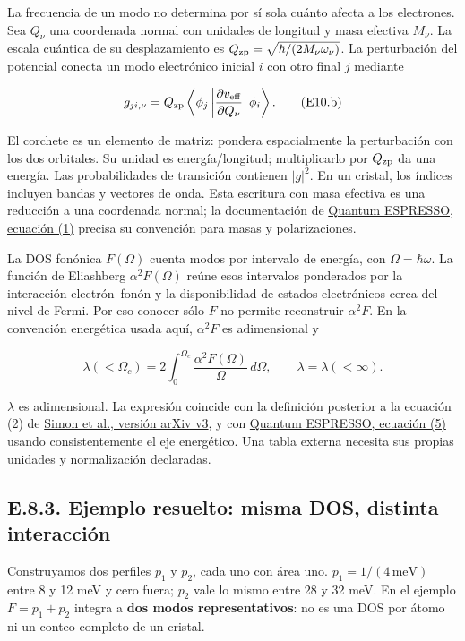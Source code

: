 \documentclass[
  spanish,
  10pt,
  a4paper,
]{article}
\begin{document}
La frecuencia de un modo no determina por sí sola cuánto afecta a los
electrones. Sea \(Q_\nu\) una coordenada normal con unidades de longitud
y masa efectiva \(M_\nu\). La escala cuántica de su desplazamiento es
\(Q_{\rm zp}=\sqrt{\hbar/(2M_\nu\omega_\nu)}\). La perturbación del
potencial conecta un modo electrónico inicial \(i\) con otro final \(j\)
mediante

\[
g_{ji,\nu}=Q_{\rm zp}
\left\langle\phi_j\left|\frac{\partial v_{\rm eff}}{\partial Q_\nu}\right|\phi_i\right\rangle.
\tag{E10.b}
\]

El corchete es un elemento de matriz: pondera espacialmente la
perturbación con los dos orbitales. Su unidad es energía/longitud;
multiplicarlo por \(Q_{\rm zp}\) da una energía. Las probabilidades de
transición contienen \(|g|^2\). En un cristal, los índices incluyen
bandas y vectores de onda. Esta escritura con masa efectiva es una
reducción a una coordenada normal; la documentación de
\href{https://www.quantum-espresso.org/Doc/ph_user_guide/node19.html}{Quantum
ESPRESSO, ecuación (1)} precisa su convención para masas y
polarizaciones.

La DOS fonónica \(F(\Omega)\) cuenta modos por intervalo de energía, con
\(\Omega=\hbar\omega\). La función de Eliashberg \(\alpha^2F(\Omega)\)
reúne esos intervalos ponderados por la interacción electrón--fonón y la
disponibilidad de estados electrónicos cerca del nivel de Fermi. Por eso
conocer sólo \(F\) no permite reconstruir \(\alpha^2F\). En la
convención energética usada aquí, \(\alpha^2F\) es adimensional y

\[
\lambda(<\Omega_c)=2\int_0^{\Omega_c}
\frac{\alpha^2F(\Omega)}{\Omega}\,d\Omega,
\qquad \lambda=\lambda(<\infty).
\tag{E10.c}
\]

\(\lambda\) es adimensional. La expresión coincide con la definición
posterior a la ecuación (2) de
\href{https://arxiv.org/html/2501.13791v3}{Simon et al., versión arXiv
v3}, y con
\href{https://www.quantum-espresso.org/Doc/ph_user_guide/node19.html}{Quantum
ESPRESSO, ecuación (5)} usando consistentemente el eje energético. Una
tabla externa necesita sus propias unidades y normalización declaradas.

\subsection{E.8.3. Ejemplo resuelto: misma DOS, distinta
interacción}\label{e.8.3.-ejemplo-resuelto-misma-dos-distinta-interacciuxf3n}

Construyamos dos perfiles \(p_1\) y \(p_2\), cada uno con área uno.
\(p_1=1/(4\,\mathrm{meV})\) entre 8 y 12 meV y cero fuera; \(p_2\) vale
lo mismo entre 28 y 32 meV. En el ejemplo \(F=p_1+p_2\) integra a
\textbf{dos modos representativos}: no es una DOS por átomo ni un conteo
completo de un cristal.
\end{document}
